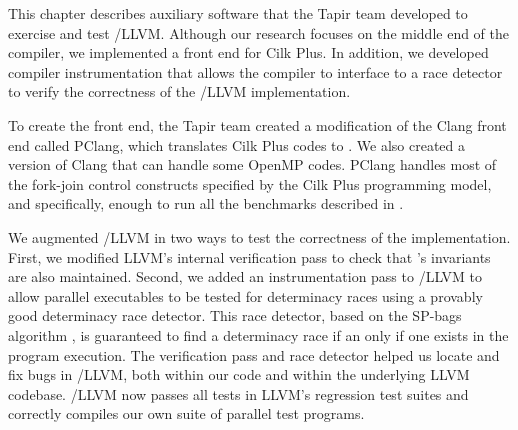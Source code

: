 
This chapter describes auxiliary software that the Tapir team developed to
exercise and test \tapir/LLVM\@.  Although our research focuses on the
middle end of the compiler, we implemented a front end for Cilk Plus.
In addition, we developed compiler instrumentation that allows the
compiler to interface to a race detector to verify the correctness of
the \tapir/LLVM implementation.


To create the front end, the Tapir team created a modification of the Clang front
end called PClang, which translates Cilk Plus codes to \tapir.  We
also created a version of Clang that can handle some OpenMP codes.
PClang handles most of the fork-join control constructs specified by
the Cilk Plus programming model, and specifically, enough to run all
the benchmarks described in .

We augmented \tapir/LLVM in two ways to test the correctness of the
implementation.  First, we modified LLVM's internal verification pass
to check that \tapir's invariants are also maintained.  Second, we
added an instrumentation pass to \tapir/LLVM to allow parallel
executables to be tested for determinacy races using a provably good
determinacy race detector.  This race detector, based on the SP-bags
algorithm \cite{FengLe99}, is guaranteed to find a determinacy race if
an only if one exists in the program execution.  The verification pass
and race detector helped us locate and fix bugs in \tapir/LLVM, both
within our code and within the underlying LLVM codebase.  \tapir/LLVM
now passes all tests in LLVM's regression test suites and correctly
compiles our own suite of parallel test programs.



